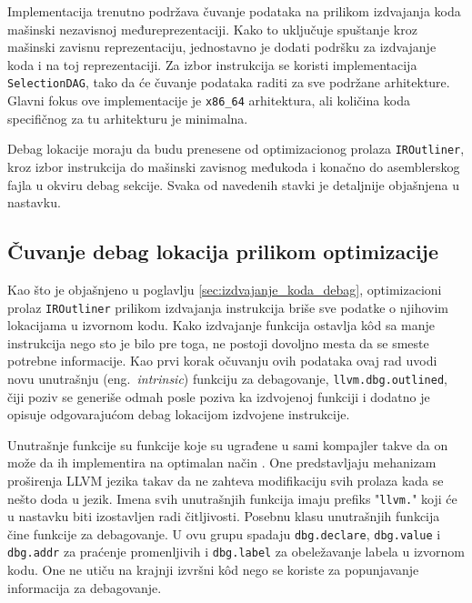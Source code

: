 \documentclass[12pt,oneside]{memoir}
\begin{document}
Implementacija trenutno podržava čuvanje podataka na prilikom izdvajanja koda mašinski nezavisnoj međureprezentaciji.
Kako to uključuje spuštanje kroz mašinski zavisnu reprezentaciju, jednostavno je dodati podršku za izdvajanje koda i na toj reprezentaciji.
Za izbor instrukcija se koristi implementacija \verb|SelectionDAG|, tako da će čuvanje podataka raditi za sve podržane arhitekture.
Glavni fokus ove implementacije je \verb|x86_64| arhitektura, ali količina koda specifičnog za tu arhitekturu je minimalna.

Debag lokacije moraju da budu prenesene od optimizacionog prolaza \verb|IROutliner|, kroz izbor instrukcija do mašinski zavisnog međukoda i konačno do asemblerskog fajla u okviru debag sekcije.
Svaka od navedenih stavki je detaljnije objašnjena u nastavku.

\subsection{Čuvanje debag lokacija prilikom optimizacije}

Kao što je objašnjeno u poglavlju \ref{sec:izdvajanje_koda_debag},
optimizacioni prolaz \verb|IROutliner| prilikom izdvajanja instrukcija briše sve podatke o njihovim lokacijama u izvornom kodu.
Kako izdvajanje funkcija ostavlja k\^od sa manje instrukcija nego sto je bilo pre toga, ne postoji dovoljno mesta da se smeste potrebne informacije.
Kao prvi korak očuvanju ovih podataka ovaj rad uvodi novu unutrašnju (eng.~{\em intrinsic}) funkciju za debagovanje, \verb|llvm.dbg.outlined|, čiji poziv se generiše odmah posle poziva ka izdvojenoj funkciji i dodatno je opisuje odgovarajućom debag lokacijom izdvojene instrukcije.

Unutrašnje funkcije su funkcije koje su ugrađene u sami kompajler takve da on može da ih implementira na optimalan način \cite{sarda2015llvm_essentials}.
One predstavljaju mehanizam proširenja LLVM jezika takav da ne zahteva modifikaciju svih prolaza kada se nešto doda u jezik.
Imena svih unutrašnjih funkcija imaju prefiks "\verb|llvm.|" koji će u nastavku biti izostavljen radi čitljivosti.
Posebnu klasu unutrašnjih funkcija čine funkcije za debagovanje.
U ovu grupu spadaju \verb|dbg.declare|, \verb|dbg.value| i \verb|dbg.addr| za praćenje promenljivih i \verb|dbg.label| za obeležavanje labela u izvornom kodu.
One ne utiču na krajnji izvršni k\^od nego se koriste za popunjavanje informacija za debagovanje.
\end{document}

